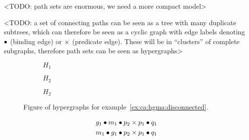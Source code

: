 \documentclass[../Master.tex]{subfiles}
\begin{document}
\providecommand{\master}{..}

<TODO: path sets are enormous, we need a more compact model>

<TODO: a set of connecting paths can be seen as a tree with many duplicate subtrees, which can therefore be seen as a cyclic graph with edge labels denoting $\bullet$ (binding edge) or $\times$ (predicate edge). These will be in ``clusters'' of complete subgraphs, therefore path sets can be seen as hypergraphs>

\begin{figure}
    \centering
    \begin{subfigure}{0.28\textwidth}
        \centering
        \raisebox{-0.5\height}{\resizebox{\linewidth}{!}{}}
        \caption{$H_1$}
        \label{fig:ca:graphExTree}
    \end{subfigure}%
    \hfill%
    \begin{subfigure}{0.28\textwidth}
        \centering
        \resizebox{0.65\linewidth}{!}{\raisebox{-0.5\height}{}}
        \caption{$H_2$}
        \label{fig:ca:graphExGraph}
    \end{subfigure}
    \begin{subfigure}{0.28\textwidth}
        \centering
        \resizebox{0.65\linewidth}{!}{\raisebox{-0.5\height}{}}
        \caption{$H_2$}
        \label{fig:ca:graphExHG}
    \end{subfigure}
    \caption{Figure of hypergraphs for example~\ref{ex:ca:hgma:disconnected}.}\label{fig:ex:ca:hgma:ex:disconnected}
\end{figure}

\begin{example}
    \begin{align*}
        & g_1 \bullet m_1 \bullet p_2 \times p_1 \bullet q_1 \\
        & m_1 \bullet g_1 \bullet p_2 \times p_1 \bullet q_1
    \end{align*}
\end{example}
\end{document}
